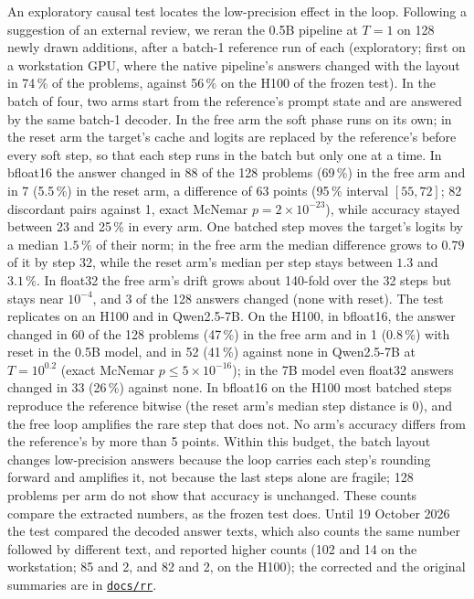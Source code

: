 \documentclass[11pt,letterpaper]{article}
\newcommand{\repourl}{https://github.com/tdj28/neural-shrimp}
\newcommand{\reporef}{arxiv-v1}
\newcommand{\repo}[1]{\href{\repourl/blob/\reporef/#1}{\nolinkurl{#1}}}
\begin{document}
An exploratory causal test locates the low-precision effect in the loop. Following a suggestion of an external review, we reran
the 0.5B pipeline at $T=1$ on 128 newly drawn additions, after a batch-1 reference run of each (exploratory; first on a
workstation GPU, where the native pipeline's answers changed with the layout in 74\,\% of the problems, against
56\,\% on the H100 of the frozen test). In the batch of four, two arms start from the reference's prompt state and
are answered by the same batch-1 decoder. In the free arm the soft phase runs on its own; in the reset arm the
target's cache and logits are replaced by the reference's before every soft step, so that each step runs in the batch
but only one at a time. In bfloat16 the answer changed in 88 of the 128 problems (69\,\%) in the free arm and in 7
(5.5\,\%) in the reset arm, a difference of 63 points (95\,\% interval $[55,72]$; 82 discordant pairs against 1, exact
McNemar $p=2\times10^{-23}$), while accuracy stayed between 23 and 25\,\% in every arm. One batched step moves the
target's logits by a median $1.5\,\%$ of their norm; in the free arm the median difference grows to $0.79$ of it by
step 32, while the reset arm's median per step stays between $1.3$ and $3.1\,\%$. In float32 the free arm's drift grows about 140-fold over the
32 steps but stays near $10^{-4}$, and 3 of the 128 answers changed (none with reset). The test replicates on an H100
and in Qwen2.5-7B. On the H100, in bfloat16, the answer changed in 60 of the 128 problems (47\,\%) in the free arm and
in 1 (0.8\,\%) with reset in the 0.5B model, and in 52 (41\,\%) against none in Qwen2.5-7B at $T=10^{0.2}$
(exact McNemar $p\le5\times10^{-16}$); in the 7B model even float32 answers changed in 33 (26\,\%) against none. In bfloat16 on the H100 most batched steps reproduce the reference bitwise (the reset arm's median step distance is
0), and the free loop amplifies the rare step that does not. No arm's
accuracy differs from the reference's by more than 5 points. Within this budget, the batch layout
changes low-precision answers because the loop carries each step's rounding forward and amplifies it, not because the
last steps alone are fragile; 128 problems per arm do not show that accuracy is unchanged. These counts compare the
extracted numbers, as the frozen test does. Until 19 October 2026 the test compared the decoded answer texts, which
also counts the same number followed by different text, and reported higher counts (102 and 14 on the workstation; 85
and 2, and 82 and 2, on the H100); the corrected and the original summaries are in \repo{docs/rr}.
\end{document}
